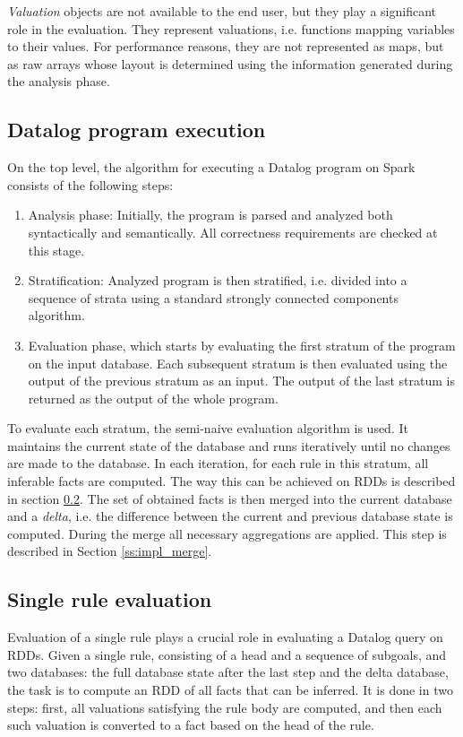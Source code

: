 \emph{Valuation} objects are not available to the end user, but they play a significant role in the evaluation. They represent valuations, i.e. functions mapping variables to their values. For performance reasons, they are not represented as maps, but as raw arrays whose layout is determined using the information generated during the analysis phase.

\subsection{Datalog program execution}

On the top level, the algorithm for executing a Datalog program on Spark consists of the following steps:

\begin{enumerate}
\item Analysis phase: Initially, the program is parsed and analyzed both syntactically and semantically. All correctness requirements are checked at this stage.

\item Stratification: Analyzed program is then stratified, i.e. divided into a sequence of strata using a standard strongly connected components algorithm.

\item Evaluation phase, which starts by evaluating the first stratum of the program on the input database. Each subsequent stratum is then evaluated using the output of the previous stratum as an input. The output of the last stratum is returned as the output of the whole program.

\end{enumerate}

To evaluate each stratum, the semi-naive evaluation algorithm is used. It maintains the current state of the database and runs iteratively until no changes are made to the database. In each iteration, for each rule in this stratum, all inferable facts are computed. The way this can be achieved on RDDs is described in section \ref{ss:impl_evalrule}. The set of obtained facts is then merged into the current database and a \emph{delta}, i.e. the difference between the current and previous database state is computed. During the merge all necessary aggregations are applied. This step is described in Section \ref{ss:impl_merge}.

\subsection{Single rule evaluation}\label{ss:impl_evalrule}
Evaluation of a single rule plays a crucial role in evaluating a Datalog query on RDDs. Given a single rule, consisting of a head and a sequence of subgoals, and two databases: the full database state after the last step and the delta database, the task is to compute an RDD of all facts that can be inferred. It is done in two steps: first, all valuations satisfying the rule body are computed, and then each such valuation is converted to a fact based on the head of the rule.

